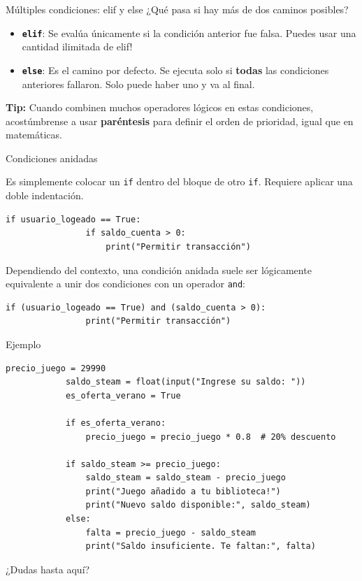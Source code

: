\documentclass[aspectratio=169, 11pt]{beamer}
\begin{document}
	\begin{frame}[fragile]{Múltiples condiciones: elif y else}
		¿Qué pasa si hay más de dos caminos posibles?
		\begin{itemize}
			\item \textbf{\texttt{elif}}: Se evalúa únicamente si la condición anterior fue falsa. \alert{Puedes usar una cantidad ilimitada de elif!}
			\item \textbf{\texttt{else}}: Es el camino por defecto. Se ejecuta solo si \textbf{todas} las condiciones anteriores fallaron. Solo puede haber uno y va al final.
		\end{itemize}
		
		\vspace{0.3cm}
		\textbf{Tip:} Cuando combinen muchos operadores lógicos en estas condiciones, acostúmbrense a usar \textbf{paréntesis} para definir el orden de prioridad, igual que en matemáticas.
	\end{frame}
	
	\begin{frame}[fragile]{Condiciones anidadas}
		
		Es simplemente colocar un \texttt{if} dentro del bloque de otro \texttt{if}. Requiere aplicar una doble indentación.
		
		\begin{lstlisting}[gobble=4]
			if usuario_logeado == True:
				if saldo_cuenta > 0:
					print("Permitir transacción")
		\end{lstlisting}
		
		\vspace{0.2cm}
		Dependiendo del contexto, una condición anidada suele ser lógicamente equivalente a unir dos condiciones con un operador \texttt{and}:
		
		\begin{lstlisting}[gobble=4]
			if (usuario_logeado == True) and (saldo_cuenta > 0):
				print("Permitir transacción")
		\end{lstlisting}
	\end{frame}
	
	\begin{frame}[fragile]{Ejemplo}
		\begin{lstlisting}[gobble=4]
			precio_juego = 29990
			saldo_steam = float(input("Ingrese su saldo: "))
			es_oferta_verano = True
			
			if es_oferta_verano:
				precio_juego = precio_juego * 0.8  # 20% descuento
			
			if saldo_steam >= precio_juego:
				saldo_steam = saldo_steam - precio_juego
				print("Juego añadido a tu biblioteca!")
				print("Nuevo saldo disponible:", saldo_steam)
			else:
				falta = precio_juego - saldo_steam
				print("Saldo insuficiente. Te faltan:", falta)
		\end{lstlisting}
	\end{frame}
	
	\begin{frame}[standout]
		¿Dudas hasta aquí?
	\end{frame}
	
\end{document}
